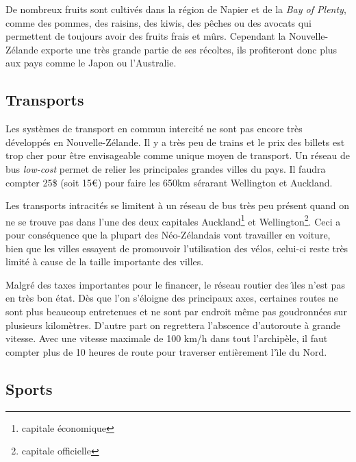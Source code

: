 \documentclass[11pt,journal]{RapportFR}
\newcommand{\Nz}{Nouvelle-Z\'elande\xspace}
\newcommand{\Nzs}{N\'eo-Z\'elandais\xspace}
\newcommand{\idn}{\^{\i}le du Nord\xspace}
\begin{document}
De nombreux fruits sont cultiv\'es dans la r\'egion de Napier et de la \emph{Bay of Plenty}, comme des pommes, des raisins, des kiwis, des pêches ou des avocats qui permettent de toujours avoir des fruits frais et m\^urs. Cependant la \Nz exporte une tr\`es grande partie de ses r\'ecoltes, ils profiteront donc plus aux pays comme le Japon ou l'Australie.


\subsection{Transports}
\label{sub:transport}

Les syst\`emes de transport en commun intercit\'e ne sont pas encore tr\`es d\'evelopp\'es en \Nz.
Il y a tr\`es peu de trains et le prix des billets est trop cher pour \^etre envisageable comme unique moyen de transport.
Un r\'eseau de bus \emph{low-cost} permet de relier les principales grandes villes du pays. Il faudra compter 25\$ (soit 15\euro) pour faire les 650km s\'erarant Wellington et Auckland. 

Les transports intracit\'es se limitent \`a un r\'eseau de bus tr\`es peu pr\'esent quand on ne se trouve pas dans l'une des deux capitales Auckland\footnote{capitale \'economique} et Wellington\footnote{capitale officielle}.
Ceci a pour cons\'equence que la plupart des \Nzs vont travailler en voiture, bien que les villes essayent de promouvoir l'utilisation des v\'elos, celui-ci reste tr\`es limit\'e \`a cause de la taille importante des villes.

Malgr\'e des taxes importantes pour le financer, le r\'eseau routier des \^{\i}les n'est pas en tr\`es bon \'etat.
D\`es que l'on s'\'eloigne des principaux axes, certaines routes ne sont plus beaucoup entretenues et ne sont par endroit m\^eme pas goudronn\'ees sur plusieurs kilom\`etres.
D'autre part on regrettera l'abscence d'autoroute \`a grande vitesse.
Avec une vitesse maximale de 100 km/h dans tout l'archip\`ele, il faut compter plus de 10 heures de route pour traverser enti\`erement l'\idn.

\subsection{Sports}
\label{sub:sport}

\end{document}
